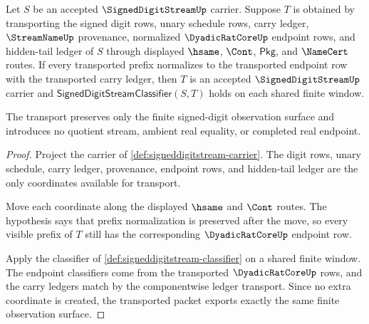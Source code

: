 \begin{theorem}
\label{thm:signeddigitstream-window-transport}
Let $S$ be an accepted $\SignedDigitStreamUp$ carrier. Suppose $T$ is obtained by transporting the signed digit rows, unary schedule rows, carry ledger, $\StreamNameUp$ provenance, normalized $\DyadicRatCoreUp$ endpoint rows, and hidden-tail ledger of $S$ through displayed $\hsame$, $\Cont$, $\mathsf{Pkg}$, and $\NameCert$ routes. If every transported prefix normalizes to the transported endpoint row with the transported carry ledger, then $T$ is an accepted $\SignedDigitStreamUp$ carrier and $\mathsf{SignedDigitStreamClassifier}(S,T)$ holds on each shared finite window.

The transport preserves only the finite signed-digit observation surface and introduces no quotient stream, ambient real equality, or completed real endpoint.
\end{theorem}
\begin{proof}
Project the carrier of \autoref{def:signeddigitstream-carrier}. The digit rows, unary schedule, carry ledger, provenance, endpoint rows, and hidden-tail ledger are the only coordinates available for transport.

Move each coordinate along the displayed $\hsame$ and $\Cont$ routes. The hypothesis says that prefix normalization is preserved after the move, so every visible prefix of $T$ still has the corresponding $\DyadicRatCoreUp$ endpoint row.

Apply the classifier of \autoref{def:signeddigitstream-classifier} on a shared finite window. The endpoint classifiers come from the transported $\DyadicRatCoreUp$ rows, and the carry ledgers match by the componentwise ledger transport. Since no extra coordinate is created, the transported packet exports exactly the same finite observation surface.
\end{proof}

